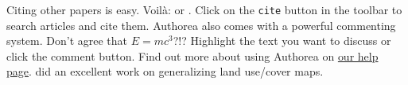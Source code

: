 Citing other papers is easy. Voilà: \cite{2012} or \cite{Holstein_2009}. Click on the \verb|cite| button in the toolbar to search articles and cite them. Authorea also comes with a powerful commenting system. Don't agree that $E  =  mc^{3}$?!? Highlight the text you want to discuss or click the comment button. Find out more about using Authorea on \href{https://www.authorea.com/help}{our help page}.\citet{Ai_2002} did an excellent work on generalizing land use/cover maps.
